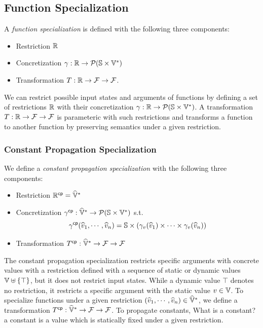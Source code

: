 \subsection{Function Specialization}

A \textit{function specialization} is defined with the following three
components:
\begin{itemize}
  \item Restriction $\mathbb{R}$
  \item Concretization $\gamma: \mathbb{R} \rightarrow \mathcal{P}(\mathbb{S}
    \times \mathbb{V}^*)$
  \item Transformation $T: \mathbb{R} \rightarrow \mathcal{F}
    \rightarrow \mathcal{F}$.
\end{itemize}
We can restrict possible input states and arguments of functions by defining a
set of restrictions $\mathbb{R}$ with their concretization $\gamma:
\mathbb{R} \rightarrow \mathcal{P}(\mathbb{S} \times \mathbb{V}^*)$. A transformation
$T: \mathbb{R} \rightarrow \mathcal{F} \rightarrow \mathcal{F}$ is
parameteric with such restrictions and transforms a function to another function
by preserving semantics under a given restriction.


\subsubsection{Constant Propagation Specialization}
We define a \textit{constant propagation specialization} with the following
three components:

\begin{itemize}
  \item Restriction $\mathbb{R}^{\textsf{cp}} = \widehat{\mathbb{V}}^*$
  \item Concretization $\gamma^{\textsf{cp}}: \widehat{\mathbb{V}}^* \rightarrow \mathcal{P}(\mathbb{S}
    \times \mathbb{V}^*)$ s.t.
    \[
      \gamma^{\textsf{cp}}(\widehat{v}_1, \cdots, \widehat{v}_n) =
      \mathbb{S} \times (\gamma_v(\widehat{v}_1) \times \cdots \times \gamma_v(\widehat{v}_n))
    \]
  \item Transformation $T^{\textsf{cp}}: \widehat{\mathbb{V}}^* \rightarrow \mathcal{F}
    \rightarrow \mathcal{F}$
\end{itemize}
The constant propagation specialization restricts specific arguments with
concrete values with a restriction defined with a sequence of static or dynamic
values $\mathbb{V} \uplus \{ \top \}$, but it does not restrict input states.
While a dynamic value $\top$ denotes no restriction, it restricts a specific
argument with the static value $v \in \mathbb{V}$. To specialize functions under
a given restriction $(\widehat{v}_1, \cdots, \widehat{v}_n) \in \widehat{\mathbb{V}}^*$, we
define a transformation $T^{\textsf{cp}}: \widehat{\mathbb{V}}^* \rightarrow \mathcal{F}
\rightarrow \mathcal{F}$. To propagate constants, \todo What is a constant?
a constant is a value which is statically fixed under a given restriction.

